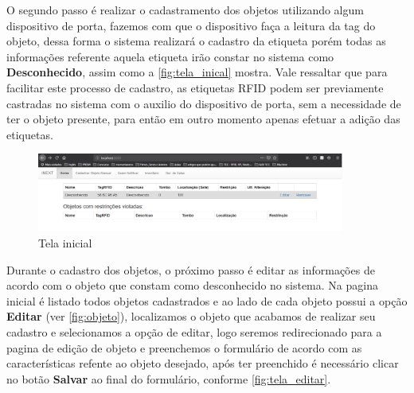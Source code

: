 \par
O segundo passo é realizar o cadastramento dos objetos utilizando algum dispositivo de porta, fazemos com que o dispositivo faça a leitura da tag do objeto, dessa forma o sistema realizará o cadastro da etiqueta porém todas as informações referente aquela etiqueta irão constar no sistema como \textbf{Desconhecido}, assim como a \autoref{fig:tela_inical} mostra. Vale ressaltar que para facilitar este processo de cadastro, as etiquetas RFID podem ser previamente castradas no sistema com o auxilio do dispositivo de porta, sem a necessidade de ter o objeto presente, para então em outro momento apenas efetuar a adição das etiquetas.

\begin{figure}[H]
              \caption{\label{fig:tela_inical}Tela inicial}
              \centering
              \includegraphics[width=0.9\textwidth]{Figuras/tela_inical.PNG}
\end{figure}


\par
Durante o cadastro dos objetos, o próximo passo é editar as informações de acordo com o objeto que constam como desconhecido no sistema. Na pagina inicial é listado todos objetos cadastrados e ao lado de cada objeto possui a opção \textbf{Editar} (ver \autoref{fig:objeto}), localizamos o objeto que acabamos de realizar seu cadastro e selecionamos a opção de editar, logo seremos redirecionado para a pagina de edição de objeto e preenchemos o formulário de acordo com as características refente ao objeto desejado, após ter preenchido é necessário clicar no botão \textbf{Salvar} ao final do formulário, conforme \autoref{fig:tela_editar}.  

